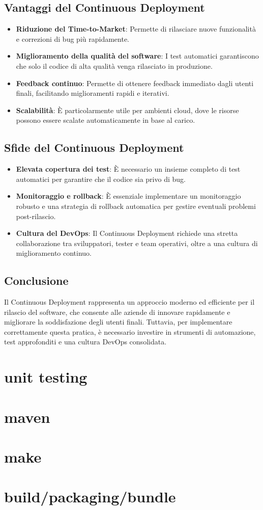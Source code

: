 \documentclass{article}
\begin{document}
\subsection{Vantaggi del Continuous Deployment}
\begin{itemize}
    \item \textbf{Riduzione del Time-to-Market}: Permette di rilasciare nuove funzionalità e correzioni di bug più rapidamente.
    \item \textbf{Miglioramento della qualità del software}: I test automatici garantiscono che solo il codice di alta qualità venga rilasciato in produzione.
    \item \textbf{Feedback continuo}: Permette di ottenere feedback immediato dagli utenti finali, facilitando miglioramenti rapidi e iterativi.
    \item \textbf{Scalabilità}: È particolarmente utile per ambienti cloud, dove le risorse possono essere scalate automaticamente in base al carico.
\end{itemize}

\subsection{Sfide del Continuous Deployment}
\begin{itemize}
    \item \textbf{Elevata copertura dei test}: È necessario un insieme completo di test automatici per garantire che il codice sia privo di bug.
    \item \textbf{Monitoraggio e rollback}: È essenziale implementare un monitoraggio robusto e una strategia di rollback automatica per gestire eventuali problemi post-rilascio.
    \item \textbf{Cultura del DevOps}: Il Continuous Deployment richiede una stretta collaborazione tra sviluppatori, tester e team operativi, oltre a una cultura di miglioramento continuo.
\end{itemize}

\subsection{Conclusione}
Il Continuous Deployment rappresenta un approccio moderno ed efficiente per il rilascio del software, che consente alle aziende di innovare rapidamente e migliorare la soddisfazione degli utenti finali. Tuttavia, per implementare correttamente questa pratica, è necessario investire in strumenti di automazione, test approfonditi e una cultura DevOps consolidata.

\section{unit testing}
\section{maven}
\section{make}
\section{build/packaging/bundle}
\end{document}
